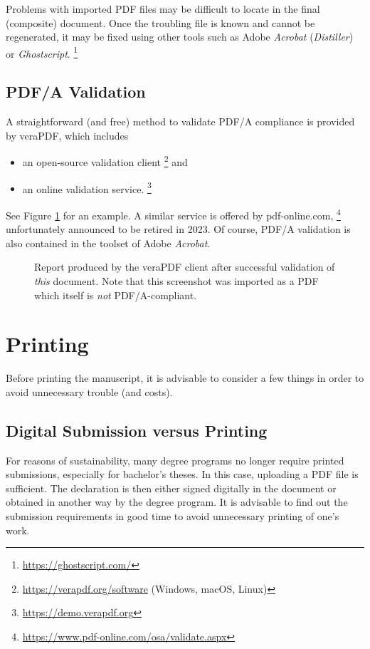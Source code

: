 Problems with imported PDF files may be difficult to locate in the final (composite)
document. Once the troubling file is known and cannot be regenerated, it may be fixed using 
other tools such as Adobe \emph{Acrobat} (\emph{Distiller}) or \emph{Ghostscript}.%
\footnote{\url{https://ghostscript.com/}}


\subsection{PDF/A Validation}
\label{sec:PDFA-validation}

A straightforward (and free) method to validate PDF/A compliance is provided by
\textsf{veraPDF}, which includes
%
\begin{itemize}
\item an open-source validation client%
  \footnote{\url{https://verapdf.org/software} (Windows, macOS, Linux)} and
\item an online validation service.%
  \footnote{\url{https://demo.verapdf.org}}
\end{itemize}
%
See Figure \ref{fig:verapdf-report} for an example.
A similar service is offered by \textsf{pdf-online.com},%
\footnote{\url{https://www.pdf-online.com/osa/validate.aspx}}
unfortunately announced to be retired in 2023.
Of course, PDF/A validation is also contained in the toolset of Adobe \emph{Acrobat}.

\begin{figure}[htbp]
    \centering
    \caption{Report produced by the \textsf{veraPDF} client after successful validation
    of \emph{this} document. Note that this screenshot was imported as a PDF 
    which itself is \emph{not} PDF/A-compliant.}
    \label{fig:verapdf-report}
\end{figure}


\section{Printing}

Before printing the manuscript, it is advisable to consider a few things in
order to avoid unnecessary trouble (and costs).

\subsection{Digital Submission versus Printing}

For reasons of sustainability, many degree programs no longer require printed
submissions, especially for bachelor's theses. In this case, uploading a PDF
file is sufficient. The declaration is then either signed digitally in the
document or obtained in another way by the degree program. It is advisable to
find out the submission requirements in good time to avoid unnecessary printing
of one's work.

